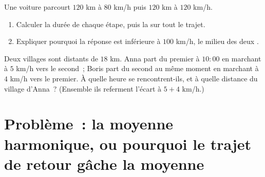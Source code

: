 \begin{exercise}[$\star\star$]\label{exo:g8:speed:10}
Une voiture parcourt $120$ km à $80$ km/h puis $120$ km à $120$ km/h.
\begin{enumerate}
  \item Calculer la durée de chaque étape, puis la  sur
        tout le trajet.
  \item Expliquer pourquoi la réponse est inférieure à $100$ km/h, le
        milieu des deux .
\end{enumerate}
\end{exercise}

\begin{exercise}[$\star\star\star$]\label{exo:g8:speed:11}
Deux villages sont distants de $18$ km. Anna part du premier à
$10{:}00$ en marchant à $5$ km/h vers le second~; Boris part du second
au même moment en marchant à $4$ km/h vers le premier. À quelle heure
se rencontrent-ils, et à quelle distance du village d'Anna~?
(Ensemble ils referment l'écart à $5 + 4$ km/h.)
\end{exercise}

\section{Problème~: la moyenne harmonique, ou pourquoi le trajet de
retour gâche la moyenne}

